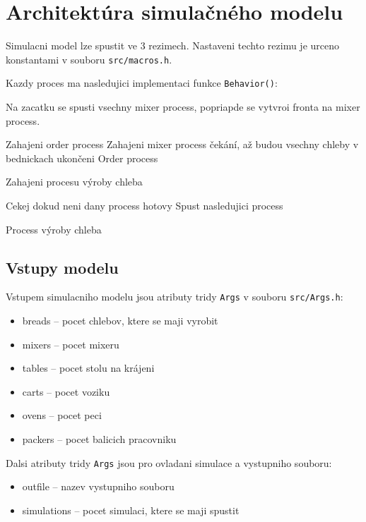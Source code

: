 \documentclass[a4paper, 10pt]{article}
\begin{document}
    \section{Architektúra simulačného modelu}
    Simulacni model\cite[slide 44]{IMS_slides} lze spustit ve 3 rezimech. Nastaveni techto
    rezimu je urceno konstantami v souboru \texttt{src/macros.h}.

    Kazdy proces ma nasledujici implementaci funkce \texttt{Behavior()}:

    Na zacatku se spusti vsechny mixer process, popriapde se vytvroi fronta na mixer process.
    \begin{algorithm}[ht]

        Zahajeni order process\;
        {
            Zahajeni mixer process\;
        }
        čekání, až budou vsechny chleby v bednickach\;
        ukončeni Order process\;

        \caption{Zahajeni procesu výroby chleba}
        \label{algorithm:orderprocess}
    \end{algorithm}

    \begin{algorithm}[ht]
        Cekej dokud neni dany process hotovy\;
        Spust nasledujici process\;
        \caption{Process výroby chleba}
        \label{algorithm:otherprocess}
    \end{algorithm}

    \subsection{Vstupy modelu}
    Vstupem simulacniho modelu jsou atributy tridy \texttt{Args} v souboru \texttt{src/Args.h}:
    \begin{itemize}
        \item breads -- pocet chlebov, ktere se maji vyrobit
        \item mixers -- pocet mixeru
        \item tables -- pocet stolu na krájeni
        \item carts -- pocet voziku
        \item ovens -- pocet peci
        \item packers -- pocet balicich pracovniku
    \end{itemize}

    Dalsi atributy tridy \texttt{Args} jsou pro ovladani simulace a vystupniho souboru:
    \begin{itemize}
        \item outfile -- nazev vystupniho souboru
        \item simulations -- pocet simulaci, ktere se maji spustit
    \end{itemize}
\end{document}
